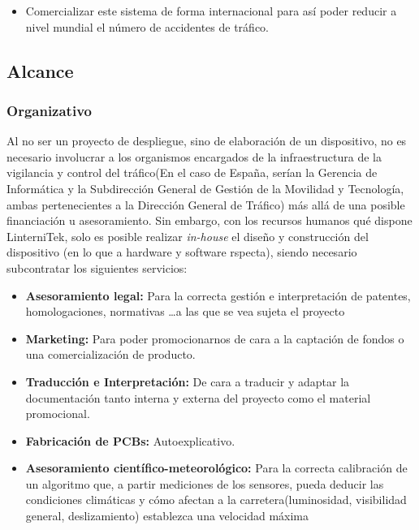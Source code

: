 \documentclass[
	a4paper, %
	12pt, %
]{CSSullivanBusinessReport}
\begin{document}
\begin{fullwidth}
\begin{itemize}
    \item  Comercializar este sistema de forma internacional para así poder reducir a nivel mundial el número de accidentes de tráfico. 
\end{itemize}



\subsection{Alcance}
\subsubsection{Organizativo}
Al no ser un proyecto de despliegue, sino de elaboración de un dispositivo, no es necesario involucrar a los organismos encargados de la infraestructura de la vigilancia y control del tráfico(En el caso de España, serían la Gerencia de Informática y la Subdirección General de Gestión de la Movilidad y Tecnología, ambas pertenecientes a la Dirección General de Tráfico) más allá de una posible financiación u asesoramiento. Sin embargo, con los recursos humanos qué dispone LinterniTek, solo es posible realizar \textit{in-house} el diseño y construcción del dispositivo (en lo que a hardware y software rspecta), siendo necesario  subcontratar los siguientes servicios: 
\begin{itemize}
    \item \textbf{Asesoramiento legal:} Para la correcta gestión e interpretación de patentes, homologaciones, normativas \ldots a las que se vea sujeta el proyecto
    \item \textbf{Marketing:} Para poder promocionarnos de cara a la captación de fondos o una comercialización de producto.
    \item \textbf{Traducción e Interpretación:} De cara a traducir y adaptar la documentación tanto interna y externa del proyecto como el material promocional.
    \item \textbf{Fabricación de PCBs:} Autoexplicativo.
     \item \textbf{Asesoramiento científico-meteorológico:} Para la correcta calibración de un algoritmo que, a partir mediciones de los sensores, pueda deducir las condiciones climáticas y cómo afectan a la carretera(luminosidad, visibilidad general, deslizamiento) establezca una velocidad máxima
\end{itemize}


\end{fullwidth}
\end{document}
